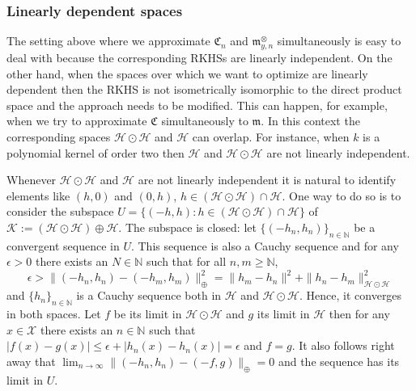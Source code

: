 \documentclass[10pt]{amsart}
\theoremstyle{definition}\newtheorem{defi}[theo]{Definition}\newtheorem{rema}[theo]{Remark}\newtheorem{exam}[theo]{Example}\newtheorem{exem}[theo]{Example}\newtheorem{nota}[theo]{Notation}
\theoremstyle{remark}
\newcommand{\bbN}{\mathbb{N}}
\newcommand{\X}{\mathcal{X}}
\newcommand{\cH}{\mathcal{H}}
\newcommand{\clK}{\mathcal{K}}
\newcommand{\fkC}{\mathfrak{C}}
\newcommand{\mean}{\mathfrak{m}}
\begin{document}
\subsubsection{Linearly dependent spaces} \label{sec:quotient_lin_dep}
The setting above where we approximate $\fkC_n$ and $\mean^\otimes_{y,n}$ simultaneously is easy to deal with because the corresponding RKHSs are linearly independent. On the other hand, when the spaces over which we want to optimize are linearly dependent then the RKHS is not isometrically isomorphic to the direct product space and the approach needs to be modified. This can happen, for example, when we try to approximate $\fkC$ simultaneously to $\mean$. In this context the corresponding spaces $\cH \odot \cH$ and $\cH$ can overlap. For instance, when $k$ is a polynomial kernel of order two then $\cH$ and $\cH \odot \cH$ are not linearly independent.


Whenever $\cH \odot \cH$ and $\cH$ are not linearly independent it is natural to identify elements like $(h,0)$ and $(0,h)$, $h\in (\cH \odot \cH) \cap \cH$. One way to do so is to consider the subspace $U = \{(-h,h) : h \in (\cH \odot \cH) \cap \cH \}$ of $\clK:= (\cH \odot \cH) \oplus \cH$. The subspace is closed: let $\{(-h_n,h_n)\}_{n \in \bbN}$ be a convergent sequence in $U$. This sequence is also a Cauchy sequence and for any $\epsilon >0$ there exists an $N \in \bbN$ such that for all $n,m \geq \bbN$,
\[
\epsilon > \| (-h_n,h_n) - (-h_m,h_m)\|_\oplus^2 = \|h_m - h_n\|^2 + \|h_n -h_m\|^2_{\cH \odot \cH}
\]
and $\{h_n\}_{n\in \bbN}$ is a Cauchy sequence both in $\cH$ and $\cH \odot \cH$. Hence, it converges in both spaces. Let $f$ be its limit in $\cH \odot \cH$ and $g$ its limit in $\cH$ then for any $x \in \X$ there exists an $n\in\bbN$ such that $|f(x) - g(x)| \leq \epsilon + |h_n(x) - h_n(x)| = \epsilon$ and $f = g$. It also follows right away that $\lim_{n\rightarrow \infty} \|(-h_n,h_n) - (-f,g)\|_\oplus = 0 $ and the sequence has its limit in $U$.
\end{document}

